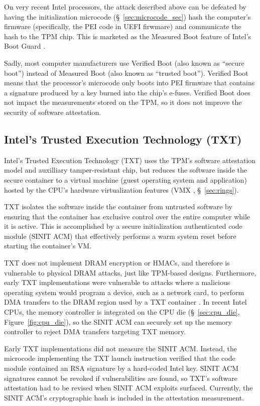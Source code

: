 On very recent Intel processors, the attack described above can be defeated by
having the initialization microcode (\S~\ref{sec:microcode_sec}) hash the
computer's firmware (specifically, the PEI code in UEFI \cite{forum2015uefi}
firwmare) and communicate the hash to the TPM chip. This is marketed as the
Measured Boot feature of Intel's Boot Guard \cite{ruan2014intelme}.

Sadly, most computer manufacturers use Verified Boot (also known as ``secure
boot'') instead of Measured Boot (also known as ``trusted boot''). Verified
Boot means that the processor's microcode only boots into PEI firmware that
contains a signature produced by a key burned into the chip's e-fuses. Verified
Boot does not impact the measurements stored on the TPM, so it does not improve
the security of software attestation.


\subsection{Intel's Trusted Execution Technology (TXT)}

Intel's Trusted Execution Technology (TXT) \cite{grawrock2009txt} uses the
TPM's software attestation model and auxilliary tamper-resistant chip, but
reduces the software inside the secure container to a virtual machine (guest
operating system and application) hosted by the CPU's hardware virtualization
features (VMX \cite{uhlig2005vmx}, \S~\ref{sec:rings}).

TXT isolates the software inside the container from untrusted software by
ensuring that the container has exclusive control over the entire computer
while it is active. This is accomplished by a secure initialization
authenticated code module (SINIT ACM) that effectively performs a warm system
reset before starting the container's VM.

TXT does not implement DRAM encryption or HMACs, and therefore is vulnerable to
physical DRAM attacks, just like TPM-based designs. Furthermore, early TXT
implementations were vulnerable to attacks where a malicious operating system
would program a device, such as a network card, to perform DMA transfers
to the DRAM region used by a TXT container \cite{wojtczuk2009txt,
wojtczuk2009txt2}. In recent Intel CPUs, the memory controller is integrated on
the CPU die (\S~\ref{sec:cpu_die}, Figure~\ref{fig:cpu_die}), so the SINIT ACM
can securely set up the memory controller to reject DMA transfers targeting TXT
memory.

Early TXT implementations did not measure the SINIT ACM. Instead, the microcode
implementing the TXT launch instruction verified that the code module contained
an RSA signature by a hard-coded Intel key. SINIT ACM signatures cannot be
revoked if vulnerabilities are found, so TXT's software attestation had to be
revised when SINIT ACM exploits \cite{wojtczuk2011txt} surfaced. Currently, the
SINIT ACM's cryptographic hash is included in the attestation measurement.

